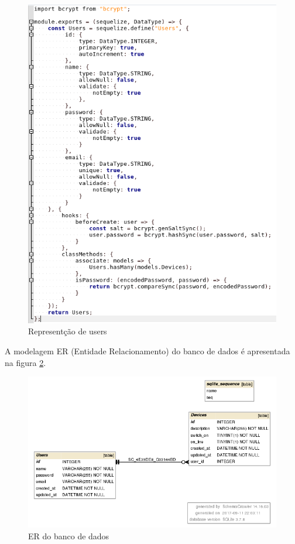 \begin{figure}[H]
\caption{\label{doc-users} Representção de users}
\includegraphics[scale=0.5]{img/users-doc.png}
\end{figure}

A modelagem ER (Entidade Relacionamento) do banco de dados é apresentada na figura \ref{er-db}.

\begin{figure}[H]
\caption{\label{er-db} ER do banco de dados}
\includegraphics[scale=0.5]{img/ysto-db.png}
\end{figure}




